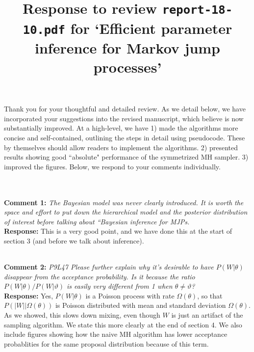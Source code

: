 \documentclass[11pt]{article}
\title{Response to review {\texttt{report-18-10.pdf}} for `Efficient parameter inference for Markov jump processes'}
\author{}
\date{}
\newcommand{\rev}[2]{\textbf{Comment #1: }\emph{#2}}
\newcommand{\resp}{\textbf{Response: }}
\begin{document}
\maketitle

Thank you for your thoughtful and detailed review. As we detail below, we have incorporated your suggestions into the revised manuscript, which believe is now substantially improved. At a high-level, we have 1) made the algorithms more concise and self-contained, outlining the steps in detail using pseudocode. These by themselves should allow readers to implement the algorithms. 2) presented results showing good ``absolute" performance of the symmetrized MH sampler. 3) improved the figures.
Below, we respond to your comments individually.

~\\~\\

\noindent \rev{1}{The Bayesian model was never clearly introduced. It is worth the space and effort to put down the hierarchical model and the posterior distribution of interest before talking about “Bayesian inference for MJPs.} \\
\resp This is a very good point, and we have done this at the start of section 3 (and before we talk about inference).

~\\
\rev{2}{P9L47 Please further explain why it’s desirable to have $P(W|\theta)$ disappear from the acceptance probability. Is it because the ratio 
$P(W|\theta)/P(W |\vartheta)$ is easily very different from 1 when $\theta \neq \vartheta$?} \\
\resp Yes, $P(W|\theta)$ is a Poisson process with rate $\Omega(\theta)$, so that $P(|W||\Omega(\theta))$ is Poisson distributed with mean and standard deviation $\Omega(\theta)$. 
As we showed, this slows down mixing, even though $W$ is just an artifact of the sampling algorithm.
We state this more clearly at the end of section 4. 
We also include figures showing how the naive MH algorithm has lower acceptance probablities for the same proposal distribution because of this term. 
\end{document}
